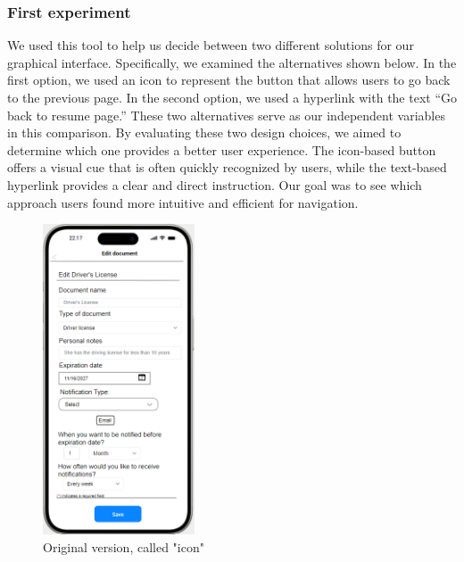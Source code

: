 		\subsubsection{First experiment}
		We used this tool to help us decide between two different solutions for our graphical interface. Specifically, we examined the alternatives shown below. In the first option, we used an icon to represent the button that allows users to go back to the previous page. In the second option, we used a hyperlink with the text “Go back to resume page.” These two alternatives serve as our independent variables in this comparison.\newline
		By evaluating these two design choices, we aimed to determine which one provides a better user experience. The icon-based button offers a visual cue that is often quickly recognized by users, while the text-based hyperlink provides a clear and direct instruction. Our goal was to see which approach users found more intuitive and efficient for navigation.
			\begin{figure}[htbp]
				\centering
				\includegraphics[width=0.4\textwidth]{../mockups/edit_variant.png}  %
				\caption{Original version, called "icon"}
			\end{figure}
			\clearpage
